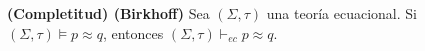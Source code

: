   \begin{theorem} \label{theorem_89}
    \PN \textbf{(Completitud) (Birkhoff)} Sea $(\Sigma, \tau)$ una teoría ecuacional. Si $(\Sigma, \tau) \models p
    \approx q$, entonces $(\Sigma, \tau) \vdash_{ec} p \approx q$.
  \end{theorem}
